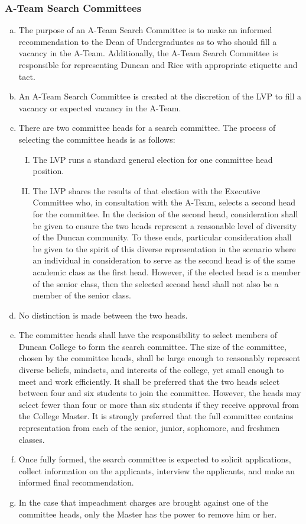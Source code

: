 \documentclass[USletter,12pt]{article}
\begin{document}
\subsubsection{A-Team Search Committees}
	\begin{enumerate}[(a)]
	\item The purpose of an A-Team Search Committee is to make an informed recommendation to the Dean of Undergraduates as to who should fill a vacancy in the A-Team.  Additionally, the A-Team Search Committee is responsible for representing Duncan and Rice with appropriate etiquette and tact.
	\item An A-Team Search Committee is created at the discretion of the LVP to fill a vacancy or expected vacancy in the A-Team.
	\item There are two committee heads for a search committee.  The process of selecting the committee heads is as follows:
		\begin{enumerate}[(I)]
		\item The LVP runs a standard general election for one committee head position.
		\item The LVP shares the results of that election with the Executive Committee who, in consultation with the A-Team, selects a second head for the committee.  In the decision of the second head, consideration shall be given to ensure the two heads represent a reasonable level of diversity of the Duncan community.  To these ends, particular consideration shall be given to the spirit of this diverse representation in the scenario where an individual in consideration to serve as the second head is of the same academic class as the first head.  However, if the elected head is a member of the senior class, then the selected second head shall not also be a member of the senior class.
		\end{enumerate}
	\item No distinction is made between the two heads.
	\item The committee heads shall have the responsibility to select members of Duncan College to form the search committee.  The size of the committee, chosen by the committee heads, shall be large enough to reasonably represent diverse beliefs, mindsets, and interests of the college, yet small enough to meet and work efficiently.  It shall be preferred that the two heads select between four and six students to join the committee.  However, the heads may select fewer than four or more than six students if they receive approval from the College Master.  It is strongly preferred that the full committee contains representation from each of the senior, junior, sophomore, and freshmen classes.
	\item Once fully formed, the search committee is expected to solicit applications, collect information on the applicants, interview the applicants, and make an informed final recommendation.
	\item In the case that impeachment charges are brought against one of the committee heads, only the Master has the power to remove him or her.
	\end{enumerate}
\end{document}
